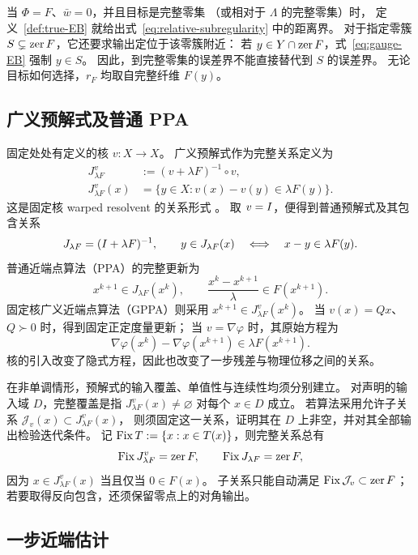 当 $\Phi=F$、$\bar w=0$，并且目标是完整零集
（或相对于 $\Lambda$ 的完整零集）时，
定义~\ref{def:true-EB} 就给出式~\eqref{eq:relative-subregularity}
中的距离界。
对于指定零簇 $S\subsetneq\operatorname{zer} F$，它还要求输出定位于该零簇附近：
若 $y\in Y\cap\operatorname{zer} F$，式~\eqref{eq:gauge-EB} 强制 $y\in S$。
因此，到完整零集的误差界不能直接替代到 $S$ 的误差界。
无论目标如何选择，$r_F$ 均取自完整纤维 $F(y)$。

\subsection{广义预解式及普通 PPA}
\label{subsec:resolvents}

固定处处有定义的核 $v:X\to X$。
广义预解式作为完整关系定义为
\begin{equation}
 \begin{split}
 J^v_{\lambda F}&:=(v+\lambda F)^{-1}\circ v,\\
 J^v_{\lambda F}(x)
 &=\{y\in X:v(x)-v(y)\in\lambda F(y)\}.
 \end{split}
 \label{eq:generalized-resolvent}
\end{equation}
这是固定核 warped resolvent 的关系形式
\cite[Definition~1.1]{BuiCombettes2020Warped}。
取 $v=I$，便得到普通预解式及其包含关系
\[
 J_{\lambda F}=(I+\lambda F)^{-1},\qquad
 y\in J_{\lambda F}(x)\quad\Longleftrightarrow\quad
 x-y\in\lambda F(y).
\]
普通近端点算法（PPA）的完整更新为
\begin{equation}
 x^{k+1}\in J_{\lambda F}(x^k),\qquad
 \frac{x^k-x^{k+1}}{\lambda}\in F(x^{k+1}).
 \label{eq:complete-PPA}
\end{equation}
固定核广义近端点算法（GPPA）则采用
$x^{k+1}\in J^v_{\lambda F}(x^k)$。
当 $v(x)=Qx$、$Q\succ0$ 时，得到固定正定度量更新；
当 $v=\nabla\varphi$ 时，其原始方程为
\[
 \nabla\varphi(x^k)-\nabla\varphi(x^{k+1})
 \in\lambda F(x^{k+1}).
\]
核的引入改变了隐式方程，因此也改变了一步残差与物理位移之间的关系。

在非单调情形，预解式的输入覆盖、单值性与连续性均须分别建立。
对声明的输入域 $D$，完整覆盖是指
$J^v_{\lambda F}(x)\ne\varnothing$ 对每个 $x\in D$ 成立。
若算法采用允许子关系 $\mathcal J_v(x)\subset J^v_{\lambda F}(x)$，
则须固定这一关系，证明其在 $D$ 上非空，并对其全部输出检验迭代条件。
记 $\operatorname{Fix} T:=\{x:x\in T(x)\}$，则完整关系总有
\[
 \operatorname{Fix} J^v_{\lambda F}=\operatorname{zer} F,\qquad
 \operatorname{Fix} J_{\lambda F}=\operatorname{zer} F,
\]
因为 $x\in J^v_{\lambda F}(x)$ 当且仅当 $0\in F(x)$。
子关系只能自动满足 $\operatorname{Fix}\mathcal J_v\subset\operatorname{zer} F$；
若要取得反向包含，还须保留零点上的对角输出。

\subsection{一步近端估计}
\label{subsec:one-step}

